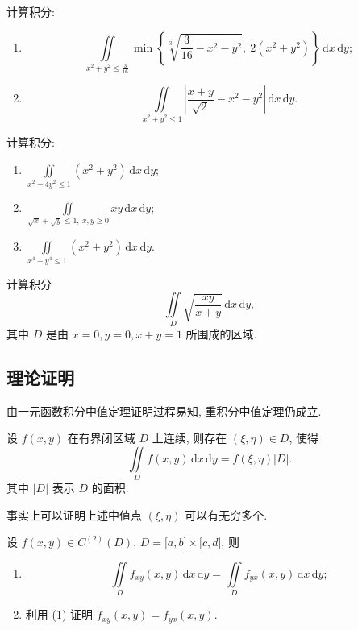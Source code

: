 \documentclass[../数学分析培优讲义.tex]{subfiles}
\begin{document}
\begin{example}
计算积分:
\begin{enumerate}[label=(\arabic*)]
    \item
    \[
        \iint\limits_{x^2+y^2\leq\frac{3}{16}}
        \min\left\{\sqrt[3]{\dfrac{3}{16}-x^2-y^2},\ 2(x^2+y^2)\right\}\,\mathrm{d}x\,\mathrm{d}y;
    \]
    \item
    \[
        \iint\limits_{x^2+y^2\leq1}\left|\dfrac{x+y}{\sqrt{2}}-x^2-y^2\right|\,\mathrm{d}x\,\mathrm{d}y.
    \]
\end{enumerate}
\end{example}
\exampleblank

\begin{example}
计算积分:
\begin{enumerate}[label=(\arabic*)]
    \item $\displaystyle\iint\limits_{x^2+4y^2\leq1}(x^2+y^2)\,\mathrm{d}x\,\mathrm{d}y$;
    \item $\displaystyle\iint\limits_{\sqrt{x}+\sqrt{y}\leq1,\ x,y\geq0}xy\,\mathrm{d}x\,\mathrm{d}y$;
    \item $\displaystyle\iint\limits_{x^4+y^4\leq1}(x^2+y^2)\,\mathrm{d}x\,\mathrm{d}y$.
\end{enumerate}
\end{example}
\exampleblank

\begin{example}
计算积分
\[
    \iint\limits_D\sqrt{\dfrac{xy}{x+y}}\,\mathrm{d}x\,\mathrm{d}y,
\]
其中 $D$ 是由 $x=0,y=0,x+y=1$ 所围成的区域.
\end{example}
\exampleblank


\newpage

\subsection{理论证明}

由一元函数积分中值定理证明过程易知, 重积分中值定理仍成立.

\begin{theorem}[\markstar]
设 $f(x,y)$ 在有界闭区域 $D$ 上连续, 则存在 $(\xi,\eta)\in D$, 使得
\[
    \iint\limits_Df(x,y)\,\mathrm{d}x\,\mathrm{d}y=f(\xi,\eta)|D|.
\]
其中 $|D|$ 表示 $D$ 的面积.
\end{theorem}

\begin{remark}
事实上可以证明上述中值点 $(\xi,\eta)$ 可以有无穷多个.
\end{remark}

\begin{example}
设 $f(x,y)\in C^{(2)}(D)$, $D=\lbrack a,b\rbrack\times\lbrack c,d\rbrack$, 则
\begin{enumerate}[label=(\arabic*)]
    \item
    \[
        \iint\limits_D f_{xy}(x,y)\,\mathrm{d}x\,\mathrm{d}y
        =\iint\limits_D f_{yx}(x,y)\,\mathrm{d}x\,\mathrm{d}y;
    \]
    \item 利用 (1) 证明 $f_{xy}(x,y)=f_{yx}(x,y)$.
\end{enumerate}
\end{example}
\exampleblank
\end{document}
